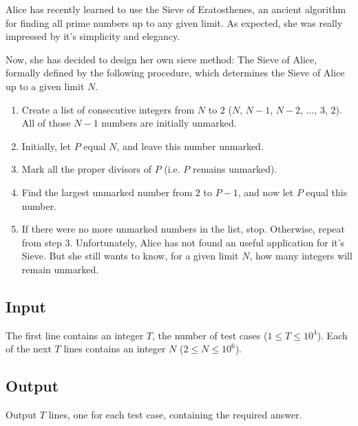 Alice has recently learned to use the Sieve of Eratosthenes, an ancient
algorithm for finding all prime numbers up to any given limit. As expected, she
was really impressed by it's simplicity and elegancy.

Now, she has decided to design her own sieve method: The Sieve of Alice,
    formally defined by the following procedure, which determines the Sieve of
    Alice up to a given limit $N$.

\begin{enumerate}
\item Create a list of consecutive integers from $N$ to $2$ ($N$, $N-1$, $N-2$,
    ..., $3$, $2$). All of those $N-1$ numbers are initially unmarked.

\item Initially, let $P$ equal $N$, and leave this number unmarked.

\item Mark all the proper divisors of $P$ (i.e. $P$ remains unmarked).

\item Find the largest unmarked number from $2$ to $P - 1$, and now let $P$ equal this number.

\item If there were no more unmarked numbers in the list, stop. Otherwise,
    repeat from step $3$.  Unfortunately, Alice has not found an useful
    application for it's Sieve. But she still wants to know, for a given limit
    $N$, how many integers will remain unmarked.
\end{enumerate}

\subsection*{Input}

The first line contains an integer $T$, the number of test cases ($1 \leq T
    \leq 10^4$). Each of the next $T$ lines contains an integer $N$ ($2 \leq N
    \leq 10^6$).

\subsection*{Output}

Output $T$ lines, one for each test case, containing the required answer.

